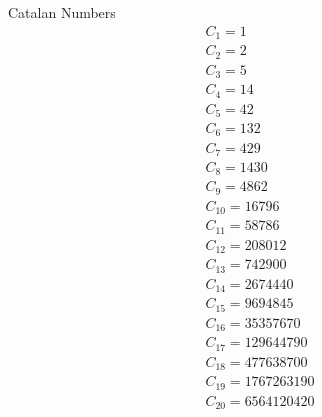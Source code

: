\documentclass[12pt,reqno]{amsart}
\begin{document}
\thispagestyle{empty}
Catalan Numbers \\
\Huge
\begin{gather*}
C_{1} = 1\\
C_{2} = 2\\
C_{3} = 5\\
C_{4} = 14\\
C_{5} = 42\\
C_{6} = 132\\
C_{7} = 429\\
C_{8} = 1430\\
C_{9} = 4862\\
C_{10} = 16796\\
C_{11} = 58786\\
C_{12} = 208012\\
C_{13} = 742900\\
C_{14} = 2674440\\
C_{15} = 9694845\\
C_{16} = 35357670\\
C_{17} = 129644790\\
C_{18} = 477638700\\
C_{19} = 1767263190\\
C_{20} = 6564120420
\end{gather*}
\end{document}
